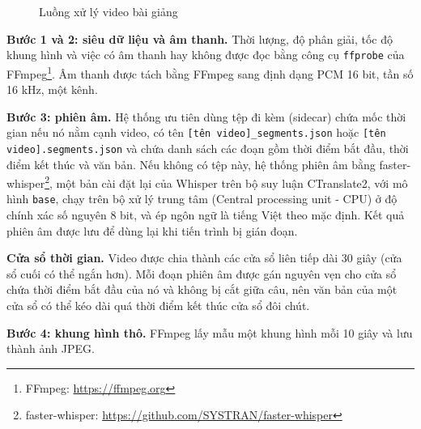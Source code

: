 \begin{figure}[ht]
    \centering
    
    \caption{Luồng xử lý video bài giảng}
    \label{fig:video}
\end{figure}

\bigbreak\noindent
\textbf{Bước 1 và 2: siêu dữ liệu và âm thanh.} Thời lượng, độ phân giải, tốc độ khung hình và việc có âm thanh hay không được đọc bằng công cụ \texttt{ffprobe} của FFmpeg\footnote{FFmpeg: \url{https://ffmpeg.org}}. Âm thanh được tách bằng FFmpeg sang định dạng PCM 16 bit, tần số 16 kHz, một kênh.

\bigbreak\noindent
\textbf{Bước 3: phiên âm.} Hệ thống ưu tiên dùng tệp đi kèm (sidecar) chứa mốc thời gian nếu nó nằm cạnh video, có tên \texttt{[tên video]\_segments.json} hoặc \texttt{[tên video].segments.json} và chứa danh sách các đoạn gồm thời điểm bắt đầu, thời điểm kết thúc và văn bản. Nếu không có tệp này, hệ thống phiên âm bằng faster-whisper\footnote{faster-whisper: \url{https://github.com/SYSTRAN/faster-whisper}}, một bản cài đặt lại của Whisper \cite{radford2023whisper} trên bộ suy luận CTranslate2, với mô hình \texttt{base}, chạy trên bộ xử lý trung tâm (Central processing unit - CPU) ở độ chính xác số nguyên 8 bit, và ép ngôn ngữ là tiếng Việt theo mặc định. Kết quả phiên âm được lưu để dùng lại khi tiến trình bị gián đoạn.

\bigbreak\noindent
\textbf{Cửa sổ thời gian.} Video được chia thành các cửa sổ liên tiếp dài 30 giây (cửa sổ cuối có thể ngắn hơn). Mỗi đoạn phiên âm được gán nguyên vẹn cho cửa sổ chứa thời điểm bắt đầu của nó và không bị cắt giữa câu, nên văn bản của một cửa sổ có thể kéo dài quá thời điểm kết thúc cửa sổ đôi chút.

\bigbreak\noindent
\textbf{Bước 4: khung hình thô.} FFmpeg lấy mẫu một khung hình mỗi 10 giây và lưu thành ảnh JPEG.

